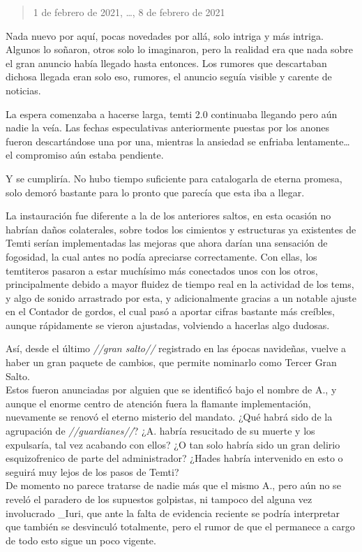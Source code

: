 \documentclass[
  spanish,
]{book}
\begin{document}
\begin{quote}
1 de febrero de 2021, \ldots, 8 de febrero de 2021
\end{quote}

Nada nuevo por aquí, pocas novedades por allá, solo intriga y más intriga. Algunos lo soñaron, otros solo lo imaginaron, pero la realidad era que nada sobre el gran anuncio había llegado hasta entonces. Los rumores que descartaban dichosa llegada eran solo eso, rumores, el anuncio seguía visible y carente de noticias.

La espera comenzaba a hacerse larga, temti 2.0 continuaba llegando pero aún nadie la veía. Las fechas especulativas anteriormente puestas por los anones fueron descartándose una por una, mientras la ansiedad se enfriaba lentamente\ldots{} el compromiso aún estaba pendiente.

Y se cumpliría. No hubo tiempo suficiente para catalogarla de eterna promesa, solo demoró bastante para lo pronto que parecía que esta iba a llegar.

La instauración fue diferente a la de los anteriores saltos, en esta ocasión no habrían daños colaterales, sobre todos los cimientos y estructuras ya existentes de Temti serían implementadas las mejoras que ahora darían una sensación de fogosidad, la cual antes no podía apreciarse correctamente. Con ellas, los temtiteros pasaron a estar muchísimo más conectados unos con los otros, principalmente debido a mayor fluidez de tiempo real en la actividad de los tems, y algo de sonido arrastrado por esta, y adicionalmente gracias a un notable ajuste en el Contador de gordos, el cual pasó a aportar cifras bastante más creíbles, aunque rápidamente se vieron ajustadas, volviendo a hacerlas algo dudosas.

Así, desde el último \emph{//gran salto//} registrado en las épocas navideñas, vuelve a haber un gran paquete de cambios, que permite nominarlo como Tercer Gran Salto.\\
Estos fueron anunciadas por alguien que se identificó bajo el nombre de A., y aunque el enorme centro de atención fuera la flamante implementación, nuevamente se renovó el eterno misterio del mandato. ¿Qué habrá sido de la agrupación de \emph{//guardianes//}? ¿A. habría resucitado de su muerte y los expulsaría, tal vez acabando con ellos? ¿O tan solo habría sido un gran delirio esquizofrenico de parte del administrador? ¿Hades habría intervenido en esto o seguirá muy lejos de los pasos de Temti?\\
De momento no parece tratarse de nadie más que el mismo A., pero aún no se reveló el paradero de los supuestos golpistas, ni tampoco del alguna vez involucrado \_Iuri, que ante la falta de evidencia reciente se podría interpretar que también se desvinculó totalmente, pero el rumor de que el permanece a cargo de todo esto sigue un poco vigente.
\end{document}
